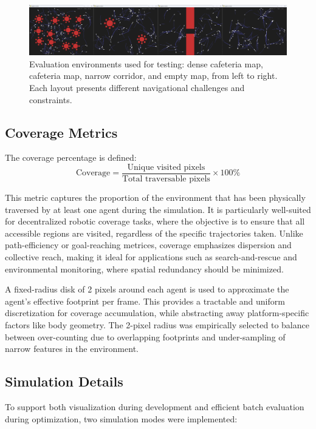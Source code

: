 \documentclass[12pt]{article}
\begin{document}
\begin{figure}[h!]
    \centering
    \includegraphics[width=\linewidth, trim=0 0 0 35, clip]{boids_maps.png}
    \caption{Evaluation environments used for testing: dense cafeteria map, cafeteria map, narrow corridor, and empty map, from left to right. Each layout presents different navigational challenges and constraints.}
    \label{fig:boids_maps}
  \end{figure}

\subsection{Coverage Metrics}

The coverage percentage is defined:
\[\text{Coverage} = \frac{\text{Unique visited pixels}}{\text{Total traversable pixels}} \times 100\%\]

This metric captures the proportion of the environment that has been physically traversed by at least one agent during the simulation. It is particularly well-suited for decentralized robotic coverage tasks, where the objective is to ensure that all accessible regions are visited, regardless of the specific trajectories taken. Unlike path-efficiency or goal-reaching metrices, coverage emphasizes dispersion and collective reach, making it ideal for applications such as search-and-rescue and environmental monitoring, where spatial redundancy should be minimized.

A fixed-radius disk of 2 pixels around each agent is used to approximate the agent's effective footprint per frame. This provides a tractable and uniform discretization for coverage accumulation, while abstracting away platform-specific factors like body geometry. The 2-pixel radius was empirically selected to balance between over-counting due to overlapping footprints and under-sampling of narrow features in the environment.


\subsection{Simulation Details}

To support both visualization during development and efficient batch evaluation during optimization, two simulation modes were implemented:
\end{document}
